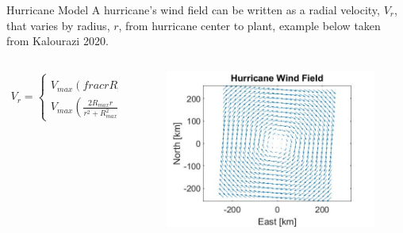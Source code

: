 \documentclass[aspectratio=169]{beamer}
\begin{document}
\begin{frame}{Hurricane Model}
A hurricane's wind field can be written as a radial velocity, $V_r$, that varies by radius, $r$, from hurricane center to plant, example below taken from Kalourazi 2020.
    \begin{columns}
    \begin{column}{0.55\textwidth}
        \begin{align}
        V_r = 
        \begin{cases}
                V_{max} \left( frac{r}{R_{max}}\right)^{\frac{3}{2}}, & r <
                R_{max} \\
                V_{max} \left( \frac{2 R_{max} r}{r^2 + R_{max}^2} \right), & r \geq R_{max} 
        \end{cases}
        \end{align}
        \end{column}
        \begin{column}{0.45\textwidth}
            \begin{figure}
            \centering
            \includegraphics[width=1\textwidth]{HurricaneWindField.jpg}
        \end{figure}
        \end{column}
    \end{columns}
\end{frame}
\end{document}
